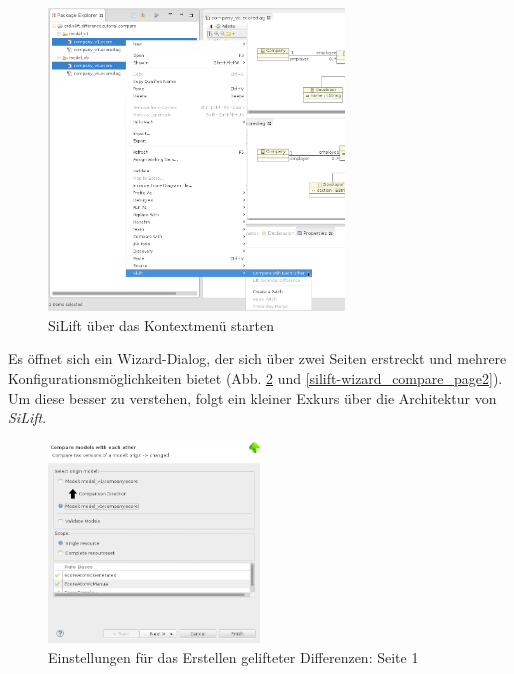 \documentclass[a4paper]{scrartcl}
\begin{document}
\begin{figure}[H]
\centering
\includegraphics[width=0.7\textwidth]{graphics/silift-contextmenu_compare.png}
\caption{SiLift über das Kontextmenü starten}
\label{silift-contextmenu_compare}
\end{figure}

Es öffnet sich ein Wizard-Dialog, der sich über zwei Seiten erstreckt und mehrere Konfigurationsmöglichkeiten bietet (Abb. \ref{silift-wizard_compare_page1} und \ref{silift-wizard_compare_page2}).
Um diese besser zu verstehen, folgt ein kleiner Exkurs über die Architektur von \textit{SiLift}.

\begin{figure}[H]
\centering
\includegraphics[width=0.5\textwidth]{graphics/silift-wizard_compare_page1.png}
\caption{Einstellungen für das Erstellen gelifteter Differenzen: Seite 1}
\label{silift-wizard_compare_page1}
\end{figure}
\end{document}

